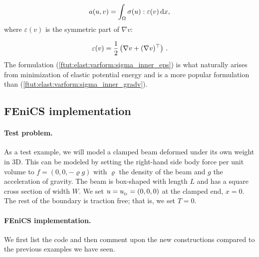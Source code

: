 \documentclass[graybox,envcountchap,sectrefs,final]{svmonodo}
\begin{document}
\begin{equation}
a(u,v) = \int_\Omega\sigma(u) :\varepsilon(v) \dx,
\label{ftut:elast:varform:sigma_inner_eps}
\end{equation}
where $\varepsilon(v)$ is the symmetric part of $\nabla v$:

\[ \varepsilon(v) = \frac{1}{2}\left(\nabla v + (\nabla v)^{\top}\right)\tp\]
The formulation (\ref{ftut:elast:varform:sigma_inner_eps}) is what naturally
arises from minimization of elastic potential energy and is a more
popular formulation than (\ref{ftut:elast:varform:sigma_inner_gradv}).

\subsection{FEniCS implementation}

\paragraph{Test problem.}
As a test example, we will model a clamped beam deformed under its
own weight in 3D. This can be modeled by setting the right-hand side
body force per unit volume to $f=(0,0,-\varrho g)$ with $\varrho$ the
density of the beam and $g$ the acceleration of gravity. The beam is
box-shaped with length $L$ and has a square cross section of width $W$. We
set $u=\ub = (0,0,0)$ at the clamped end, $x=0$. The rest of the boundary is
traction free; that is, we set $T = 0$.

\paragraph{FEniCS implementation.}
We first list the code and then comment upon the new constructions
compared to the previous examples we have seen.
\end{document}
